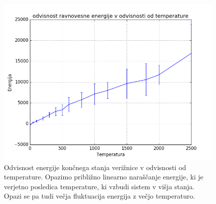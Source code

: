 \documentclass[slovene,11pt,a4paper]{article}
\numberwithin{equation}{section} %
\numberwithin{figure}{section} %
\numberwithin{table}{section} %
\begin{document}
\begin{figure}[!h]
\centering
\includegraphics[scale=0.5]{slike/eviosnost_energije_od_energije_veriznica.png}


\caption{Odvisnost energije končnega stanja verižnice v odvisnosti od temperature. Opazimo približno linearno naraščanje energije, ki je verjetno posledica temperature, ki vzbudi sistem v višja stanja. Opazi se pa tudi večja fluktuacija energija z večjo temperaturo.}
\end{figure}
\end{document}
